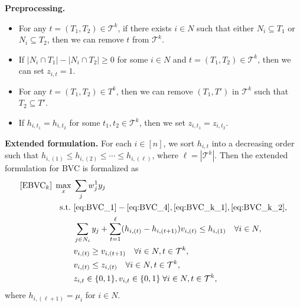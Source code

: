 \documentclass[11pt]{article}
\newcommand{\T}{\mathcal{T}}
\begin{document}
\noindent\textbf{Preprocessing.}
\begin{itemize}
	\item For any $t=(T_1, T_2) \in \T^k$, if there exists $i \in N$ such that either $N_i \subseteq T_1$ or $N_i \subseteq T_2$, then we can remove $t$ from $\T^k.$
	\item If $|N_i \cap T_1| - |N_i \cap T_2| \geq 0$ for some $i\in N$ and $t = (T_1, T_2)\in \T^k$, then we can set $z_{i, t} = 1$.
	\item For any $t = (T_1, T_2) \in T^k$, then we can remove  $(T_1, T')$ in $\T^k$ such that $T_2 \subseteq T'$.
	\item If $h_{i, t_1} = h_{i, t_2}$ for some $t_1, t_2 \in \T^k$, then we set $z_{i, t_1} = z_{i, t_2}$.
\end{itemize}

\noindent \textbf{Extended formulation.} For each $i\in [n]$, we sort $h_{i, t}$ into a decreasing order such that $h_{i, (1)} \leq h_{i, (2)} \leq \cdots \leq h_{i, (\ell)}$, where $\ell = |\T^k|$. Then the extended formulation for BVC is formalized as
\begin{subequations}
	\begin{align}
	[\text{EBVC}_k]\;\max_x\; & \sum_j w_j^1 y_j \nonumber\\
	\text{s.t.~} & \eqref{eq:BVC_1} - \eqref{eq:BVC_4}, \eqref{eq:BVC_k_1}, \eqref{eq:BVC_k_2}, \nonumber\\
	& \sum_{j\in N_i} y_j + \sum_{t=1}^\ell (h_{i, (t)} - h_{i, (t+1)}) v_{i, (t)} \leq h_{i, (1)} \quad \forall i\in N, \\
	& v_{i, (t)} \geq v_{i, (t+1)} \quad \forall i\in N, t\in \T^k, \\
	& v_{i, (t)} \leq z_{i, (t)} \quad \forall i\in N, t\in \T^k,\\ 
	&  z_{i, t} \in \{0, 1\}, v_{i, t}\in \{0, 1\} \;\forall i\in N, t\in \T^k, \nonumber
	\end{align}
\end{subequations}
where $h_{i, (\ell+1)} = \mu_i$ for $i\in N$.
\end{document}
